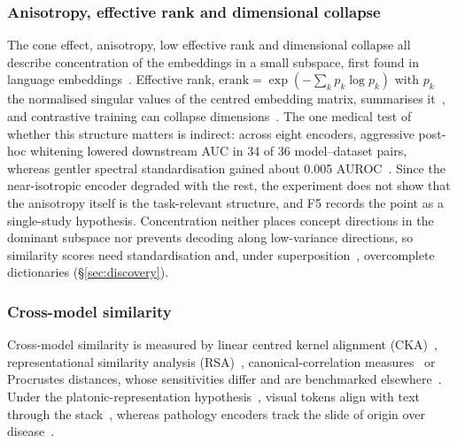 \subsubsection{Anisotropy, effective rank and dimensional collapse}

The cone effect, anisotropy, low effective rank and dimensional collapse all describe concentration of
the embeddings in a small subspace, first found in language embeddings~\cite{ethayarajh2019how}.
Effective rank, $\mathrm{erank}=\exp(-\sum_k p_k\log p_k)$ with $p_k$ the normalised singular values of
the centred embedding matrix, summarises it~\cite{roy2007effective,garrido2022rankme,rudman2022isoscore},
and contrastive training can collapse dimensions~\cite{jing2021understanding,hassanpour2024overcoming}.
The one medical test of whether this structure matters is indirect: across eight encoders, aggressive
post-hoc whitening lowered downstream AUC in 34 of 36 model--dataset pairs, whereas gentler spectral
standardisation gained about 0.005 AUROC~\cite{garciahidalgo2026embedding}. Since the near-isotropic
encoder degraded with the rest, the experiment does not show that the anisotropy itself is the
task-relevant structure, and F5 records the point as a single-study hypothesis. Concentration neither
places concept directions in the dominant subspace nor prevents decoding along low-variance directions,
so similarity scores need standardisation and, under superposition~\cite{elhage2022toy}, overcomplete
dictionaries (\S\ref{sec:discovery}).

\subsubsection{Cross-model similarity}

Cross-model similarity is measured by linear centred kernel alignment
(CKA)~\cite{kornblith2019similarity}, representational similarity analysis
(RSA)~\cite{kriegeskorte2008representational}, canonical-correlation
measures~\cite{raghu2017svcca,morcos2018insights} or Procrustes distances, whose sensitivities differ and
are benchmarked elsewhere~\cite{klabunde2023similarity,ding2021grounding}. Under the
platonic-representation hypothesis~\cite{huh2024platonic}, visual tokens align with text through the
stack~\cite{neo2024towards}, whereas pathology encoders track the slide of origin over
disease~\cite{mishra2025comparing}.

